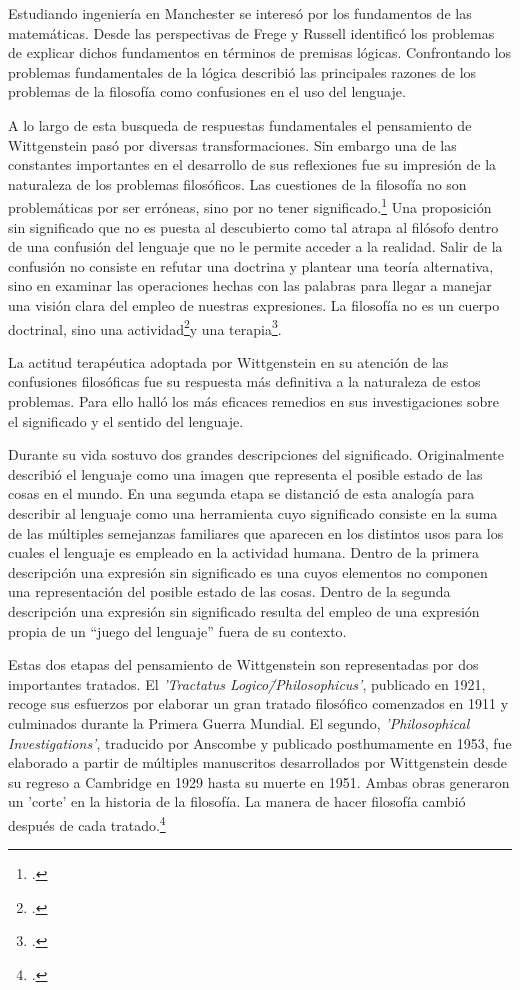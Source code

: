 Estudiando ingeniería en Manchester se interesó por los fundamentos de las
matemáticas. Desde las perspectivas de Frege y Russell identificó los problemas
de explicar dichos fundamentos en términos de premisas lógicas. 
Confrontando los problemas fundamentales de la lógica 
describió las principales razones de los problemas de la filosofía como
confusiones en el uso del lenguaje. 

A lo largo de esta busqueda de respuestas fundamentales el pensamiento de
Wittgenstein pasó por diversas transformaciones. Sin embargo una de las
constantes importantes en el desarrollo de sus reflexiones fue su impresión de
la naturaleza de los problemas filosóficos.
Las cuestiones de la filosofía no son problemáticas por ser erróneas, sino por
no tener significado.\footcite[cf.~][4.003]{tractatus} Una proposición sin
significado que no es puesta al descubierto como tal
atrapa al filósofo dentro de una confusión del lenguaje que no le permite
acceder a la realidad. Salir de la confusión no consiste en refutar una doctrina
y plantear una teoría alternativa, sino en examinar las operaciones hechas con
las palabras para llegar a manejar una visión clara del empleo de nuestras
expresiones. La filosofía no es un cuerpo doctrinal, sino una
actividad\footcite[cf.~][4.112]{tractatus}y una
terapia\footcite[cf.~][\S133]{PI}.   

La actitud terapéutica adoptada por Wittgenstein en su atención de las
confusiones filosóficas fue su respuesta más definitiva a la naturaleza de estos
problemas. Para ello halló los más eficaces remedios en sus investigaciones sobre el
significado y el sentido del lenguaje.

Durante su vida sostuvo dos grandes descripciones del significado.
Originalmente describió el lenguaje como una imagen que representa el posible
estado de las cosas en el mundo.
En una segunda etapa se distanció de esta analogía para describir al lenguaje
como una herramienta cuyo significado consiste en la suma de las múltiples
semejanzas familiares que aparecen en los distintos usos para los cuales el
lenguaje es empleado en la actividad humana.
Dentro de la primera descripción una expresión sin significado es una cuyos
elementos no componen una representación del posible estado de las cosas.
Dentro de la segunda descripción una expresión sin significado resulta del
empleo de una expresión propia de un ``juego del lenguaje'' fuera de su
contexto. 

Estas dos etapas del pensamiento de Wittgenstein 
son representadas por dos importantes tratados. 
El \emph{'Tractatus Logico\=/Philosophicus'}, publicado en 1921, recoge sus
esfuerzos por elaborar un gran tratado filosófico comenzados en 1911 y
culminados durante la Primera Guerra Mundial. El segundo, \emph{'Philosophical 
    Investigations'}, traducido por Anscombe y publicado posthumamente en 1953,
fue elaborado a partir de múltiples manuscritos desarrollados por Wittgenstein
desde su regreso a Cambridge en 1929 hasta su muerte en 1951. 
Ambas obras generaron un 'corte' en la historia de la filosofía. La manera de
hacer filosofía cambió después de cada tratado.\footcite[cf.~][p.~181]{twocuts}

